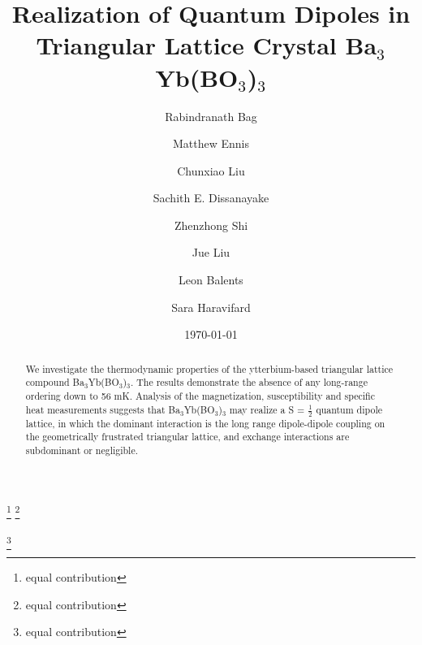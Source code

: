 \documentclass[aps,prl,reprint,showpacs,showkeys,superscriptaddress,floatfix,twocolumn]{revtex4-2}
\begin{document}
\title{Realization of Quantum Dipoles in Triangular Lattice Crystal Ba$_3$Yb(BO$_3$)$_3$}

\author{Rabindranath Bag}
\author{Matthew Ennis}\thanks{equal contribution}
\thanks{equal contribution}
\author{Chunxiao Liu}\thanks{equal contribution}
\author{Sachith E. Dissanayake}
\author{Zhenzhong Shi}
\author{Jue Liu}
\author{Leon Balents}
\author{Sara Haravifard}
  

\date{\today}

\begin{abstract}
We investigate the thermodynamic properties of the ytterbium-based triangular lattice compound Ba$_3$Yb(BO$_3$)$_3$. The results demonstrate the absence of any long-range ordering down to 56 mK. Analysis of the magnetization, susceptibility and specific heat measurements suggests that Ba$_3$Yb(BO$_3$)$_3$ may realize a S = $\frac{1}{2}$ quantum dipole lattice, in which the dominant interaction is the long range dipole-dipole coupling on the geometrically frustrated triangular lattice, and exchange interactions are subdominant or negligible.
	
\end{abstract}
	
\maketitle
\end{document}

